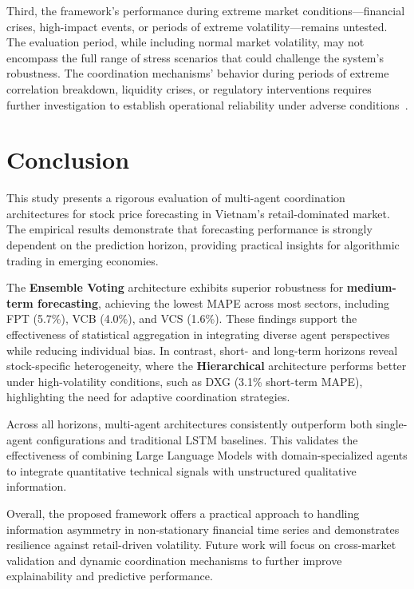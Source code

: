 \documentclass{ieeeaccess}
\begin{document}
Third, the framework's performance during extreme market conditions—financial crises, high-impact events, or periods of extreme volatility—remains untested. The evaluation period, while including normal market volatility, may not encompass the full range of stress scenarios that could challenge the system's robustness. The coordination mechanisms' behavior during periods of extreme correlation breakdown, liquidity crises, or regulatory interventions requires further investigation to establish operational reliability under adverse conditions~\cite{cont2001empirical}.

\section{Conclusion}

This study presents a rigorous evaluation of multi-agent coordination architectures for stock price forecasting in Vietnam’s retail-dominated market. The empirical results demonstrate that forecasting performance is strongly dependent on the prediction horizon, providing practical insights for algorithmic trading in emerging economies.

The \textbf{Ensemble Voting} architecture exhibits superior robustness for \textbf{medium-term forecasting}, achieving the lowest MAPE across most sectors, including FPT (5.7\%), VCB (4.0\%), and VCS (1.6\%). These findings support the effectiveness of statistical aggregation in integrating diverse agent perspectives while reducing individual bias. In contrast, short- and long-term horizons reveal stock-specific heterogeneity, where the \textbf{Hierarchical} architecture performs better under high-volatility conditions, such as DXG (3.1\% short-term MAPE), highlighting the need for adaptive coordination strategies.

Across all horizons, multi-agent architectures consistently outperform both single-agent configurations and traditional LSTM baselines. This validates the effectiveness of combining Large Language Models with domain-specialized agents to integrate quantitative technical signals with unstructured qualitative information.

Overall, the proposed framework offers a practical approach to handling information asymmetry in non-stationary financial time series and demonstrates resilience against retail-driven volatility. Future work will focus on cross-market validation and dynamic coordination mechanisms to further improve explainability and predictive performance.









\EOD
\end{document}
